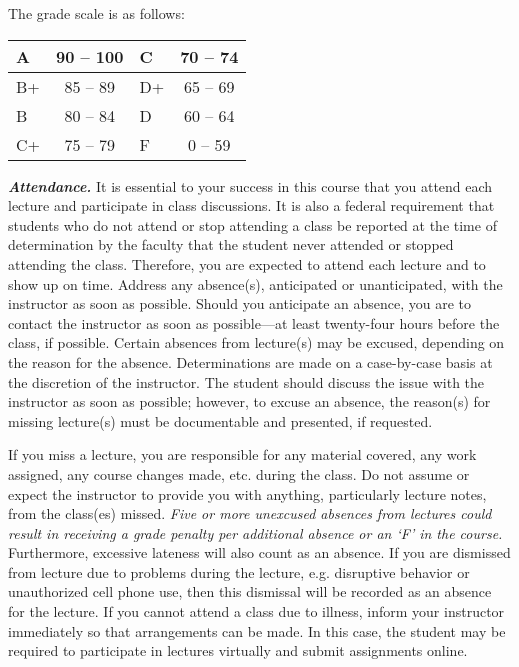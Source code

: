 \documentclass[11pt,letterpaper]{article}
\begin{document}
\newpage






The grade scale is as follows: \par
        \begin{table}[!ht]
        \centering
        \begin{tabular}{|l||c|l||c|} \hline
        A & 90 -- 100 & C & 70 -- 74 \\ \hline
        B+ & 85 -- 89 & D+ & 65 -- 69 \\ \hline
        B & 80 -- 84 & D & 60 -- 64 \\ \hline
        C+ & 75 -- 79 & F & 0 -- 59 \\ \hline
        \end{tabular}
        \end{table} 
\sectionbreak




{\itshape\bfseries\color{scred}Attendance.} It is essential to your success in this course that you attend each lecture and participate in class discussions. It is also a federal requirement that students who do not attend or stop attending a class be reported at the time of determination by the faculty that the student never attended or stopped attending the class. Therefore, you are expected to attend each lecture and to show up on time. Address any absence(s), anticipated or unanticipated, with the instructor as soon as possible. Should you anticipate an absence, you are to contact the instructor as soon as possible---at least twenty-four hours before the class, if possible. Certain absences from lecture(s) may be excused, depending on the reason for the absence. Determinations are made on a case-by-case basis at the discretion of the instructor. The student should discuss the issue with the instructor as soon as possible; however, to excuse an absence, the reason(s) for missing lecture(s) must be documentable and presented, if requested. \pspace

If you miss a lecture, you are responsible for any material covered, any work assigned, any course changes made, etc. during the class. Do not assume or expect the instructor to provide you with anything, particularly lecture notes, from the class(es) missed. {\itshape Five or more unexcused absences from lectures could result in receiving a grade penalty per additional absence or an `F' in the course.} Furthermore, excessive lateness will also count as an absence. If you are dismissed from lecture due to problems during the lecture, e.g. disruptive behavior or unauthorized cell phone use, then this dismissal will be recorded as an absence for the lecture. If you cannot attend a class due to illness, inform your instructor immediately so that arrangements can be made. In this case, the student may be required to participate in lectures virtually and submit assignments online. \pspace
\end{document}
